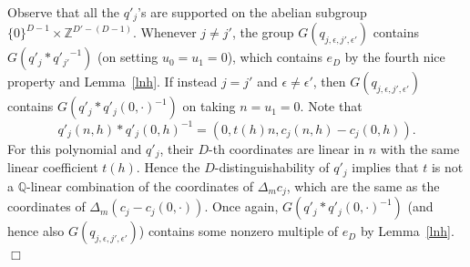 \documentclass[11pt]{amsart}
\theoremstyle{definition}
\newcommand{\Q}{{\mathbb Q}}
\newcommand{\Z}{{\mathbb Z}}
\newcommand{\eps}{\epsilon}
\newcommand{\1}{{\mathbf{1}}}
\begin{document}
Observe that all the $q'_{j}$'s are supported on the abelian subgroup $\{0\}^{D-1}\times \Z^{D'-(D-1)}$.
Whenever $j\neq j'$, the group ${G}(q_{j,\eps,j',\eps'})$ contains ${G}(q'_{j}\ast {q'_{j'}}^{-1})$ (on setting $u_0=u_1 = 0$), which contains $e_{D}$ by the fourth nice property and Lemma~\ref{lnh}. If instead  $j=j'$ and $\eps\neq \eps'$,  then ${G}(q_{j,\eps,j',\eps'})$ contains ${G}(q'_{j}\ast q'_{j}(0,\cdot)^{-1})$ on taking $n=u_1 = 0$.
Note that 
$$q'_{j}(n,h)\ast q'_{j}(0,h)^{-1}=(0,t(h)n,c_{j}(n,h)-c_{j}(0,h)).$$
For this polynomial and $q'_{j}$, their $D$-th coordinates are linear in $n$ with the same linear coefficient $t(h)$. Hence the $D$-distinguishability of $q'_j$ implies that $t$ is not a $\Q$-linear combination of the coordinates of $\Delta_{m}c_{j}$, 
which are the same as the coordinates of $\Delta_{m}(c_{j}-c_{j}(0,\cdot))$.
Once again, ${G}(q'_{j}\ast q'_{j}(0,\cdot)^{-1})$ (and hence also ${G}(q_{j,\eps,j',\eps'})$) contains {some nonzero multiple of} $e_{D}$ by Lemma~\ref{lnh}. \hfill $\Box$
\end{document}
